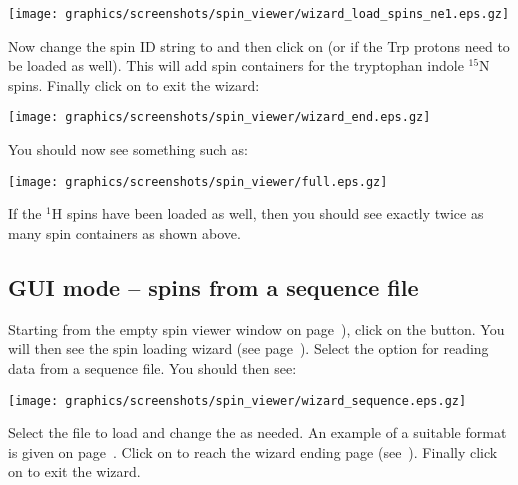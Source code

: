 \begin{minipage}[h]{\linewidth}
\centerline{\texttt{[image: graphics/screenshots/spin\_viewer/wizard\_load\_spins\_ne1.eps.gz]}}
\end{minipage}

Now change the spin ID string to  and then click on  (or  if the Trp protons  need to be loaded as well).  This will add spin containers for the tryptophan indole $^{15}$N spins.  Finally click on  to exit the wizard:

\begin{minipage}[h]{\linewidth}
\centerline{\texttt{[image: graphics/screenshots/spin\_viewer/wizard\_end.eps.gz]}}
\label{figure: spin viewer end}
\end{minipage}

You should now see something such as:

\begin{minipage}[h]{\linewidth}
\centerline{\texttt{[image: graphics/screenshots/spin\_viewer/full.eps.gz]}}
\end{minipage}

If the $^1$H spins have been loaded as well, then you should see exactly twice as many spin containers as shown above.



\subsection{GUI mode -- spins from a sequence file} \label{sect: GUI - sequence file}

Starting from the empty spin viewer window on page~\pageref{figure: spin viewer blank}), click on the  button.  You will then see the spin loading wizard (see page~\pageref{figure: spin viewer wizard start}).  Select the option for reading data from a sequence file.  You should then see:

\begin{minipage}[h]{\linewidth}
\centerline{\texttt{[image: graphics/screenshots/spin\_viewer/wizard\_sequence.eps.gz]}}
\end{minipage}

Select the file to load and change the  as needed.  An example of a suitable format is given on page~\pageref{verb: noe.500.out}.  Click on  to reach the wizard ending page (see~\pageref{figure: spin viewer end}).  Finally click on  to exit the wizard.


